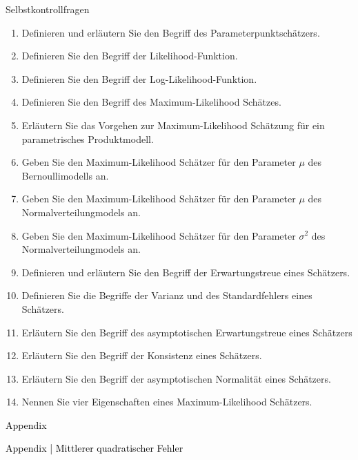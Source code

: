 \documentclass[
  8pt,
  ignorenonframetext,
]{beamer}
\begin{document}
\begin{frame}{Selbstkontrollfragen}
\protect\hypertarget{selbstkontrollfragen}{}
\footnotesize
\begin{enumerate}
\item Definieren und erläutern Sie den Begriff des Parameterpunktschätzers.
\item Definieren Sie den Begriff der Likelihood-Funktion.
\item Definieren Sie den Begriff der Log-Likelihood-Funktion.
\item Definieren Sie den Begriff des Maximum-Likelihood Schätzes.
\item Erläutern Sie das Vorgehen zur Maximum-Likelihood Schätzung für ein parametrisches Produktmodell.
\item Geben Sie den Maximum-Likelihood Schätzer für den Parameter $\mu$ des Bernoullimodells an.
\item Geben Sie den Maximum-Likelihood Schätzer für den Parameter $\mu$ des Normalverteilungmodels an.
\item Geben Sie den Maximum-Likelihood Schätzer für den Parameter $\sigma^2$ des Normalverteilungmodels an.
\item Definieren und erläutern Sie den Begriff der Erwartungstreue eines Schätzers.
\item Definieren Sie die Begriffe der Varianz und des Standardfehlers eines Schätzers.
\item Erläutern Sie den Begriff des asymptotischen Erwartungstreue eines Schätzers
\item Erläutern Sie den Begriff der Konsistenz eines Schätzers.
\item Erläutern Sie den Begriff der asymptotischen Normalität eines Schätzers.
\item Nennen Sie vier Eigenschaften eines Maximum-Likelihood Schätzers.
\end{enumerate}
\end{frame}

\begin{frame}[plain]{}
\protect\hypertarget{section-13}{}
\vfill
\center
\huge

\textcolor{black}{Appendix} \vfill
\end{frame}

\begin{frame}[plain]{}
\protect\hypertarget{section-14}{}
\vfill
\center
\huge

\textcolor{black}{Appendix | Mittlerer quadratischer Fehler} \vfill
\end{frame}
\end{document}
